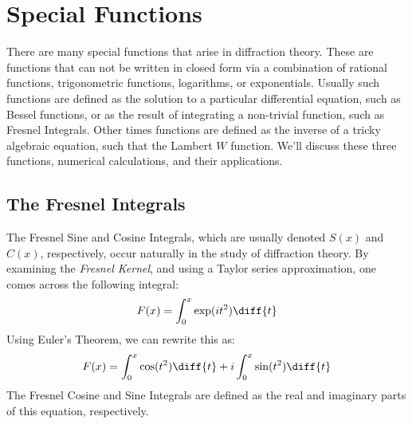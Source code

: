 \section{Special Functions}
    There are many special functions that arise in diffraction
    theory. These are functions that can not be written in
    closed form via a combination of rational functions,
    trigonometric functions, logarithms, or exponentials.
    Usually such functions are defined as the solution to
    a particular differential equation, such as Bessel
    functions, or as the result of integrating a non-trivial
    function, such as Fresnel Integrals. Other times functions
    are defined as the inverse of a tricky algebraic equation,
    such that the Lambert $W$ function. We'll discuss these
    three functions, numerical calculations, and their
    applications.
    \subsection{The Fresnel Integrals}
        The Fresnel Sine and Cosine Integrals, which are
        usually denoted $S(x)$ and $C(x)$, respectively,
        occur naturally in the study of diffraction theory.
        By examining the \textit{Fresnel Kernel},
        and using a Taylor series approximation, one
        comes across the following integral:
        \begin{equation}
            F(x)=\int_{0}^{x}\exp(it^{2})\diff{t}
        \end{equation}
        Using Euler's Theorem, we can rewrite this as:
        \begin{equation}
            F(x)=\int_{0}^{x}\cos(t^{2})\diff{t}
                +i\int_{0}^{x}\sin(t^{2})\diff{t}
        \end{equation}
        The Fresnel Cosine and Sine Integrals are defined
        as the real and
        imaginary parts of this equation, respectively.
